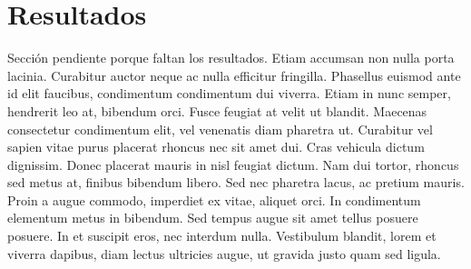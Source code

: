 \chapter{Resultados}
Sección pendiente porque faltan los resultados. Etiam accumsan non nulla porta lacinia. Curabitur auctor neque ac nulla efficitur fringilla. Phasellus euismod ante id elit faucibus, condimentum condimentum dui viverra. Etiam in nunc semper, hendrerit leo at, bibendum orci. Fusce feugiat at velit ut blandit. Maecenas consectetur condimentum elit, vel venenatis diam pharetra ut. Curabitur vel sapien vitae purus placerat rhoncus nec sit amet dui. Cras vehicula dictum dignissim. Donec placerat mauris in nisl feugiat dictum. Nam dui tortor, rhoncus sed metus at, finibus bibendum libero. Sed nec pharetra lacus, ac pretium mauris. Proin a augue commodo, imperdiet ex vitae, aliquet orci. In condimentum elementum metus in bibendum. Sed tempus augue sit amet tellus posuere posuere. In et suscipit eros, nec interdum nulla. Vestibulum blandit, lorem et viverra dapibus, diam lectus ultricies augue, ut gravida justo quam sed ligula.


